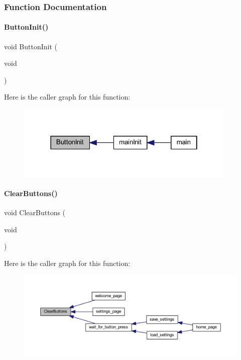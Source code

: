 \subsubsection{Function Documentation}
\mbox{\label{a00020_af645ecef369e812aeddaef421d32fda3}} 
\paragraph{Button\+Init()}
{\footnotesize\ttfamily void Button\+Init (\begin{DoxyParamCaption}\item[{void}]{ }\end{DoxyParamCaption})}

Here is the caller graph for this function\+:
\nopagebreak
\begin{figure}[H]
\begin{center}
\leavevmode
\includegraphics[width=298pt]{a00020_af645ecef369e812aeddaef421d32fda3_icgraph}
\end{center}
\end{figure}
\mbox{\label{a00020_ad54189d97d4ebc2ac5e310be78d7968f}} 
\paragraph{Clear\+Buttons()}
{\footnotesize\ttfamily void Clear\+Buttons (\begin{DoxyParamCaption}\item[{void}]{ }\end{DoxyParamCaption})}

Here is the caller graph for this function\+:
\nopagebreak
\begin{figure}[H]
\begin{center}
\leavevmode
\includegraphics[width=350pt]{a00020_ad54189d97d4ebc2ac5e310be78d7968f_icgraph}
\end{center}
\end{figure}
\mbox{\label{a00020_a03795fe6451769e81af8ef69856e8acb}} 
